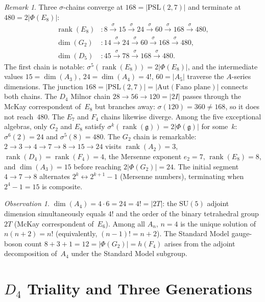 \documentclass[11pt]{amsart}
\theoremstyle{plain}
\theoremstyle{definition}
\theoremstyle{remark}
\newtheorem{remark}[theorem]{Remark}
\newtheorem{observation}[theorem]{Observation}
\newcommand{\fg}{\mathfrak{g}}
\renewcommand{\Phi}{\varPhi}
\newcommand{\rank}{\operatorname{rank}}
\begin{document}
\begin{remark}\label{rem:sigma-chain-480}
Three $\sigma$-chains converge at $168 = |\mathrm{PSL}(2,7)|$ and
terminate at $480 = 2|\Phi(E_8)|$:
\begin{align*}
  \rank(E_8) &: 8 \xrightarrow{\sigma} 15 \xrightarrow{\sigma} 24
    \xrightarrow{\sigma} 60 \xrightarrow{\sigma} 168
    \xrightarrow{\sigma} 480, \\
  \dim(G_2) &: 14 \xrightarrow{\sigma} 24 \xrightarrow{\sigma} 60
    \xrightarrow{\sigma} 168 \xrightarrow{\sigma} 480, \\
  \dim(D_5) &: 45 \xrightarrow{\sigma} 78 \xrightarrow{\sigma} 168
    \xrightarrow{\sigma} 480.
\end{align*}
The first chain is notable: $\sigma^5(\rank(E_8)) = 2|\Phi(E_8)|$,
and the intermediate values $15 = \dim(A_3)$, $24 = \dim(A_4) = 4!$,
$60 = |A_5|$ traverse the $A$-series dimensions.
The junction $168 = |\mathrm{PSL}(2,7)| = |\mathrm{Aut}(\text{Fano plane})|$
connects both chains.  The $D_4$ Milnor chain
$28 \to 56 \to 120 = |2I|$ passes through the McKay correspondent
of~$E_8$ but branches away: $\sigma(120) = 360 \ne 168$, so it does
not reach~$480$.  The $E_7$ and $F_4$ chains likewise diverge.
Among the five exceptional algebras, only $G_2$ and $E_8$ satisfy
$\sigma^k(\rank(\fg)) = 2|\Phi(\fg)|$ for some~$k$:
$\sigma^6(2) = 24$ and $\sigma^5(8) = 480$.
The $G_2$ chain is remarkable: $2 \to 3 \to 4 \to 7 \to 8 \to 15 \to 24$
visits $\rank(A_2) = 3$, $\rank(D_4) = \rank(F_4) = 4$, the
Mersenne exponent $e_2 = 7$, $\rank(E_8) = 8$, and $\dim(A_3) = 15$
before reaching $2|\Phi(G_2)| = 24$.  The initial segment
$4 \to 7 \to 8$ alternates $2^k \leftrightarrow 2^{k+1}-1$
(Mersenne numbers), terminating when $2^4 - 1 = 15$ is composite.
\end{remark}

\begin{observation}\label{obs:A4-factorial}
$\dim(A_4) = 4 \cdot 6 = 24 = 4! = |2T|$: the $\mathrm{SU}(5)$
adjoint dimension simultaneously equals $4!$ and the order of the
binary tetrahedral group $2T$ (McKay correspondent of~$E_6$).
Among all $A_n$, $n = 4$ is the unique solution of $n(n+2) = n!$
(equivalently, $(n-1)! = n+2$).
The Standard Model gauge-boson count
$8 + 3 + 1 = 12 = |\Phi(G_2)| = h(F_4)$
arises from the adjoint decomposition of~$A_4$ under the
Standard Model subgroup.
\end{observation}

\section{$D_4$ Triality and Three Generations}\label{sec:d4-triality}
\end{document}
